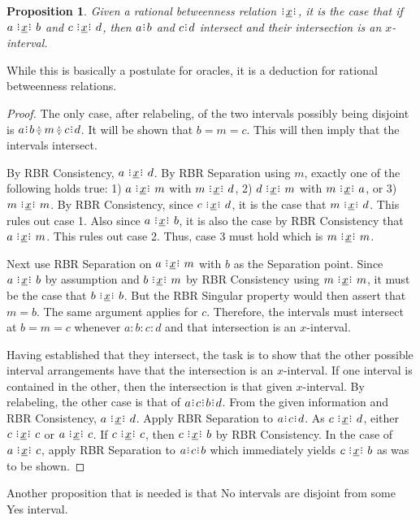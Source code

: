 \documentclass[12pt]{article}
\newtheorem{proposition}{Proposition}[section]
\begin{document}
\begin{proposition}
    Given a rational betweenness relation $\xrel$, it is the case that if $a \xrel b$ and $c \xrel d$, then $a\rint b$ and $c\rint d$ intersect and their intersection is an $x$-interval.
\end{proposition}

While this is basically a postulate for oracles, it is a deduction for rational betweenness relations. 

\begin{proof}
    The only case, after relabeling, of the two intervals possibly being disjoint is $a\rint b \betneq m \betneq c\rint d$. It will be shown that $b = m = c$. This will then imply that the intervals intersect. 
    
    By RBR Consistency, $a \xrel d$. By RBR Separation using $m$, exactly one of the following holds true:  1) $a \xrel m$ with \sout{$m \xrel d$}, 2) $d \xrel m$ with \sout{$m \xrel a$}, or 3) $m \xrel m$. By RBR Consistency, since $c \xrel d$, it is the case that $m \xrel d$. This rules out case 1. Also since $a \xrel b$, it is also the case by RBR Consistency that $a \xrel m$. This rules out case 2. Thus, case 3 must hold which is $m \xrel m$. 
    
    Next use RBR Separation on $a \xrel m$ with $b$ as the Separation point. Since $a \xrel b$ by assumption and $b \xrel m$ by RBR Consistency using $m \xrel m$, it must be the case that $b \xrel b$. But the RBR Singular property would then assert that $m = b$. The same argument applies for $c$. Therefore, the intervals must intersect at $b = m = c$ whenever $a:b:c:d$ and that intersection is an $x$-interval. 

    Having established that they intersect, the task is to show that the other possible interval arrangements have that the intersection is an $x$-interval. If one interval is contained in the other, then the intersection is that given $x$-interval. By relabeling, the other case is that of $a\rint c\rint b\rint d$. From the given information and RBR Consistency, $a \xrel d$. Apply RBR Separation to $a\rint c\rint d$. As $c \xrel d$, either $c \xrel c$ or \sout{$a \xrel c$}. If $c \xrel c$, then $c \xrel b$ by RBR Consistency. In the case of \sout{$a \xrel c$}, apply RBR Separation to $a\rint c\rint b$ which immediately yields $c \xrel b$ as was to be shown. 
    
\end{proof}


Another proposition that is needed is that No intervals are disjoint from some Yes interval. 
\end{document}

